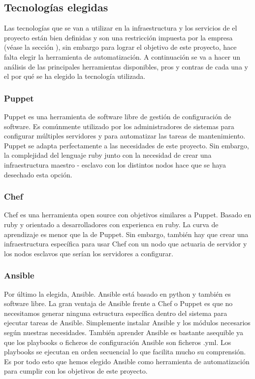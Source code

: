 	\subsection{Tecnologías elegidas}
	\label{tecnologias_elegidas}
		\begin{text}
			Las tecnologías que se van a utilizar en la infraestructura y los servicios de el proyecto están bien definidas y son una restricción impuesta por la empresa (véase la sección ), sin embargo para lograr el objetivo de este proyecto, hace falta elegir la herramienta de automatización. A continuación se va a hacer un análisis de las principales herramientas disponibles, pros y contras de cada una y el por qué se ha elegido la tecnología utilizada. \cite{comparadorAnsibleChefPuppet:online}
		\end{text}
	\subsubsection{Puppet}
		\begin{text}
			Puppet es una herramienta de software libre de gestión de configuración de software. Es comúnmente utilizado por los administradores de sistemas para configurar múltiples servidores y para automatizar las tareas de mantenimiento. Puppet se adapta perfectamente a las necesidades de este proyecto. Sin embargo, la complejidad del lenguaje ruby junto con la necesidad de crear una infraestructura maestro - esclavo con los distintos nodos hace que se haya desechado esta opción. \cite{puppet:online}
		\end{text}
		\clearpage
	\subsubsection{Chef}
		\begin{text}
			Chef es una herramienta open source con objetivos similares a Puppet. Basado en ruby y orientado a desarrolladores con experienca en ruby. La curva de aprendizaje es menor que la de Puppet. Sin embargo, también hay que crear una infraestructura específica para usar Chef con un nodo que actuaria de servidor y los nodos esclavos que serían los servidores a configurar. \cite{chef:online}
		\end{text}
		\subsubsection{Ansible}
			\begin{text}
				Por último la elegida, Ansible. Ansible está basado en python y también es software libre. La gran ventaja de Ansible frente a Chef o Puppet es que no necesitamos generar ninguna estructura específica dentro del sistema para ejecutar tareas de Ansible. Simplemente instalar Ansible y los módulos necesarios según nuestras necesidades. También aprender Ansible es bastante asequible ya que los playbooks o ficheros de configuración Ansible son ficheros .yml. Los playbooks se ejecutan en orden secuencial lo que facilita mucho su comprensión. Es por todo esto que hemos elegido Ansible como herramienta de automatización para cumplir con los objetivos de este proyecto. \cite{ansible:online}
			\end{text}
		